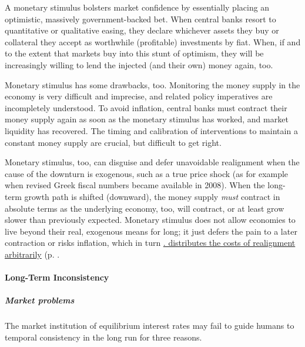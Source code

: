 A monetary stimulus bolsters market confidence by essentially placing an optimistic, massively government-backed bet. When central banks resort to quantitative or qualitative easing, they declare whichever assets they buy or collateral they accept as worthwhile (profitable) investments by fiat. When, if and to the extent that markets buy into this stunt of optimism, they will be increasingly willing to lend the injected (and their own) money again, too.

Monetary stimulus has some drawbacks, too. Monitoring the money supply in the economy is very difficult and imprecise, and related policy imperatives are incompletely understood. To avoid inflation, central banks must contract their money supply again as soon as the monetary stimulus has worked, and market liquidity has recovered. The timing and calibration of interventions to maintain a constant money supply are crucial, but difficult to get right. 

Monetary stimulus, too, can disguise and defer unavoidable realignment when the cause of the downturn is exogenous, such as a true price shock (as for example when revised Greek fiscal numbers became available in 2008). When the long-term growth path is shifted (downward), the money supply \emph{must} contract in absolute terms as the underlying economy, too, will contract, or at least grow slower than previously expected. Monetary stimulus does not allow economies to live beyond their real, exogenous means for long; it just defers the pain to a later contraction or risks inflation, which in turn \hyperref[sec:distributive-effects-of-inflation]{. distributes the costs of realignment arbitrarily} (p. \pageref{sec:distributive-effects-of-inflation}. 


\paragraph{Long-Term Inconsistency} \label{sec:long-terminconsistency}

\subparagraph{Market problems} The market institution of equilibrium interest rates may fail to guide humans to temporal consistency in the long run for three reasons.

